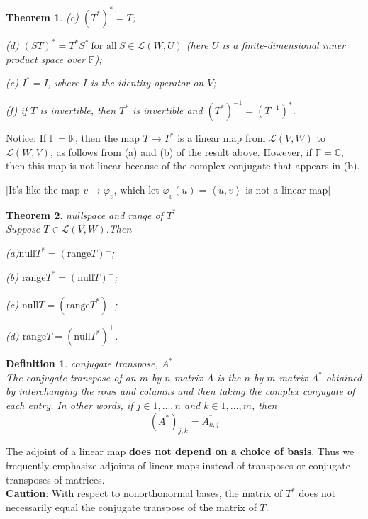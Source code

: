 \documentclass{article}
\newtheorem{theorem}{Theorem}[subsection]
\newtheorem{definition}{Definition}[subsection]
\newcommand{\RR}{\mathbb{R}}
\newcommand{\CC}{\mathbb{C}}
\newcommand{\FF}{\mathbb{F}}
\newcommand{\range}{\text{range}}
\newcommand{\n}{\text{null}}
\begin{document}
\begin{CJK}{UTF8}{gkai}
\begin{theorem}
    (c) $(T^\ast)^\ast = T$;

    (d) $(ST)^\ast = T^\ast S^\ast ~\text{for all}~ S \in \mathcal{L}(W,U)$ (here $U$ is a finite-dimensional inner product space over $\FF$);

    (e) $I^\ast = I$, where $I$ is the identity operator on $V$;

    (f) if $T$ is invertible, then $T^\ast$ is invertible and $(T^\ast)^{-1} = (T^{-1})^\ast$.
\end{theorem}

Notice: If $\FF = \RR$, then the map $T \to T^\ast$ is a linear map from $\mathcal{L}(V,W)$ to $\mathcal{L}(W,V)$, as follows from (a) and (b) of the result above. However, if $\FF = \CC$, then this map
is not linear because of the complex conjugate that appears in (b).

[It's like the map $v \to \varphi_v$, which let $\varphi_v(u) = \left<u,v\right>$ is not a linear map]

\begin{theorem}
    nullspace and range of $T^\ast$\\

    Suppose $T\in\mathcal{L}(V,W)$.Then

    (a)$ \n T^\ast=(\range T)^\bot$;

    (b) $\range T^\ast=(\n T)^\bot$;

    (c) $\n T=(\range T^\ast)^\bot$;

    (d) $\range T=(\n T^\ast)^\bot$.
\end{theorem}

\begin{definition}
    conjugate transpose, $A^\ast$\\

    The conjugate transpose of an $m $-by-$ n$ matrix $A$ is the $n$-by-$m$ matrix $A^\ast$ obtained by interchanging the rows and columns and then taking the complex conjugate of each entry. In other words, if $j\in{1,\ldots, n}$ and $k\in{1,\ldots,m }$, then
    \[( A^\ast)_{j,k}= \overline{A_{k,j}}\]
\end{definition}

The adjoint of a linear map \textbf{does not depend on a choice of basis}. Thus we frequently emphasize adjoints of linear maps instead of transposes or conjugate transposes of matrices.\\

\textbf{Caution}: With respect to nonorthonormal bases, the matrix of $T^\ast$ does not necessarily equal the conjugate transpose of the matrix of $T$.\\


\end{CJK}
\end{document}
